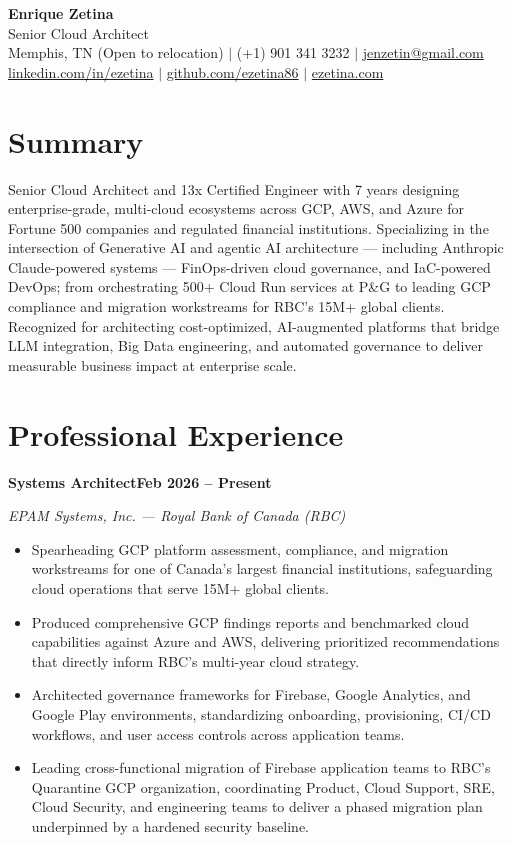 \documentclass[11pt,letterpaper]{article}
\newcommand{\job}[3]{%
  \par\vspace{4pt}%
  \noindent\textbf{#1}\hfill\textbf{#3}%
  \par\vspace{1pt}\noindent\textit{#2}%
  \par\vspace{1pt}%
}
\begin{document}
\begin{center}
{\Huge\bfseries\color{darkteal} Enrique Zetina}\\[3pt]
{\large Senior Cloud Architect}\\[5pt]
Memphis, TN (Open to relocation) $|$ (+1) 901 341 3232 $|$ \href{mailto:jenzetin@gmail.com}{jenzetin@gmail.com}\\[2pt]
\href{https://www.linkedin.com/in/ezetina}{linkedin.com/in/ezetina} $|$ \href{https://github.com/ezetina86}{github.com/ezetina86} $|$ \href{https://www.ezetina.com}{ezetina.com}
\end{center}

\section{Summary}
Senior Cloud Architect and 13x Certified Engineer with 7 years designing enterprise-grade, multi-cloud ecosystems across GCP, AWS, and Azure for Fortune 500 companies and regulated financial institutions. Specializing in the intersection of Generative AI and agentic AI architecture --- including Anthropic Claude-powered systems --- FinOps-driven cloud governance, and IaC-powered DevOps; from orchestrating 500+ Cloud Run services at P\&G to leading GCP compliance and migration workstreams for RBC's 15M+ global clients. Recognized for architecting cost-optimized, AI-augmented platforms that bridge LLM integration, Big Data engineering, and automated governance to deliver measurable business impact at enterprise scale.

\section{Professional Experience}

\job{Systems Architect}{EPAM Systems, Inc. --- Royal Bank of Canada (RBC)}{Feb 2026 -- Present}
\begin{itemize}
    \item Spearheading GCP platform assessment, compliance, and migration workstreams for one of Canada's largest financial institutions, safeguarding cloud operations that serve 15M+ global clients.
    \item Produced comprehensive GCP findings reports and benchmarked cloud capabilities against Azure and AWS, delivering prioritized recommendations that directly inform RBC's multi-year cloud strategy.
    \item Architected governance frameworks for Firebase, Google Analytics, and Google Play environments, standardizing onboarding, provisioning, CI/CD workflows, and user access controls across application teams.
    \item Leading cross-functional migration of Firebase application teams to RBC's Quarantine GCP organization, coordinating Product, Cloud Support, SRE, Cloud Security, and engineering teams to deliver a phased migration plan underpinned by a hardened security baseline.
\end{itemize}
\end{document}
